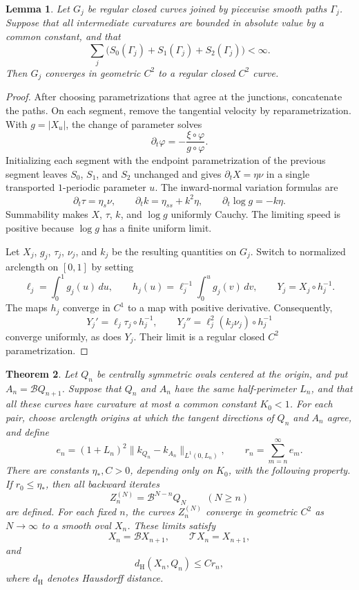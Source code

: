 \documentclass[11pt]{article}
\numberwithin{equation}{section}
\newtheorem{theorem}{Theorem}[section]
\newtheorem{lemma}[theorem]{Lemma}
\newcommand{\Tmap}{\mathcal T}
\newcommand{\Bmap}{\mathcal B}
\newcommand{\abs}[1]{\lvert #1\rvert}
\newcommand{\norm}[1]{\lVert #1\rVert}
\begin{document}
\begin{lemma}\label{lem:complete}
Let \(G_j\) be regular closed curves joined by piecewise smooth paths
\(\Gamma_j\). Suppose that all intermediate curvatures are bounded in absolute
value by a common constant, and that
\[
  \sum_j\bigl(S_0(\Gamma_j)+S_1(\Gamma_j)+S_2(\Gamma_j)\bigr)<\infty.
\]
Then \(G_j\) converges in geometric \(C^2\) to a regular closed \(C^2\)
curve.
\end{lemma}

\begin{proof}
After choosing parametrizations that agree at the junctions, concatenate the
paths. On each segment, remove the tangential velocity by reparametrization.
With \(g=\abs{X_u}\), the change of parameter solves
\[
  \partial_t\varphi=-\frac{\xi\circ\varphi}{g\circ\varphi}.
\]
Initializing each segment with the endpoint parametrization of the previous
segment leaves \(S_0\), \(S_1\), and \(S_2\) unchanged and gives
\(\partial_tX=\eta\nu\) in a single transported \(1\)-periodic parameter \(u\).
The inward-normal variation formulas are
\begin{equation}\label{eq:normal-flow}
  \partial_t\tau=\eta_s\nu,\qquad
  \partial_t k=\eta_{ss}+k^2\eta,\qquad
  \partial_t\log g=-k\eta.
\end{equation}
Summability makes \(X\), \(\tau\), \(k\), and \(\log g\) uniformly Cauchy.
The limiting speed is positive because \(\log g\) has a finite uniform
limit.

Let \(X_j\), \(g_j\), \(\tau_j\), \(\nu_j\), and \(k_j\) be the
resulting quantities on \(G_j\). Switch to normalized arclength on \([0,1]\)
by setting
\[
  \ell_j=\int_0^1 g_j(u)\,du,\qquad
  h_j(u)=\ell_j^{-1}\int_0^u g_j(v)\,dv,\qquad
  Y_j=X_j\circ h_j^{-1}.
\]
The maps \(h_j\) converge in \(C^1\) to a map with positive derivative.
Consequently,
\[
  Y_j'=\ell_j\tau_j\circ h_j^{-1},\qquad
  Y_j''=\ell_j^2(k_j\nu_j)\circ h_j^{-1}
\]
converge uniformly, as does \(Y_j\). Their limit is a regular closed
\(C^2\) parametrization.
\end{proof}

\begin{theorem}\label{thm:shadow}
Let \(Q_n\) be centrally symmetric ovals centered at the origin, and put
\(A_n=\Bmap Q_{n+1}\). Suppose that \(Q_n\) and \(A_n\) have the same
half-perimeter \(L_n\), and that all these curves have curvature at most
a common constant \(K_0<1\). For each pair, choose arclength origins at which
the tangent directions of \(Q_n\) and \(A_n\) agree, and define
\[
  e_n=(1+L_n)^2\norm{k_{Q_n}-k_{A_n}}_{L^1(0,L_n)},\qquad
  r_n=\sum_{m=n}^{\infty}e_m.
\]
There are constants \(\eta_*,C>0\), depending only on \(K_0\), with
the following property. If \(r_0\leq\eta_*\), then all backward iterates
\[
  Z_n^{(N)}=\Bmap^{N-n}Q_N\qquad(N\geq n)
\]
are defined. For each fixed \(n\), the curves \(Z_n^{(N)}\) converge in
geometric \(C^2\) as \(N\to\infty\) to a smooth oval \(X_n\). These limits
satisfy
\[
  X_n=\Bmap X_{n+1},\qquad \Tmap X_n=X_{n+1},
\]
and
\begin{equation}\label{eq:shadow-distance}
  d_{\mathrm H}(X_n,Q_n)\leq Cr_n,
\end{equation}
where \(d_{\mathrm H}\) denotes Hausdorff distance.
\end{theorem}
\end{document}
